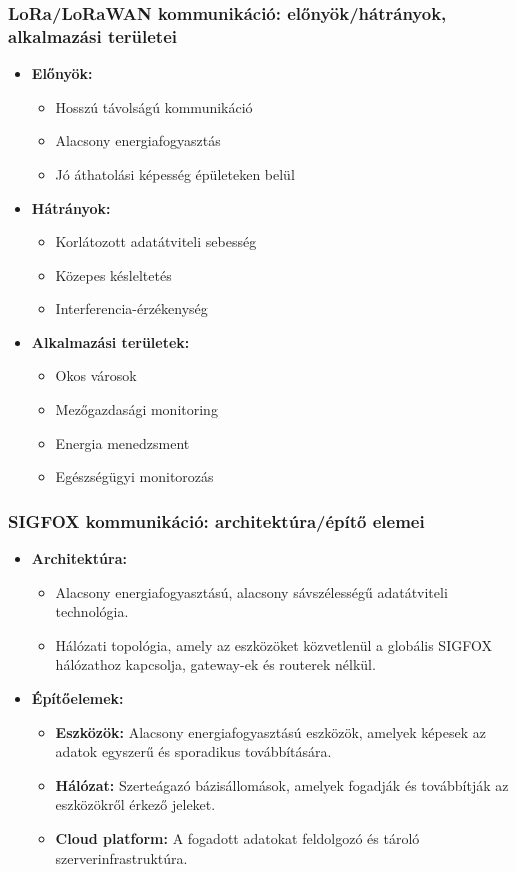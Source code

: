 \subsubsection{LoRa/LoRaWAN kommunikáció: előnyök/hátrányok, alkalmazási területei}
\begin{itemize}
    \item \textbf{Előnyök:}
    \begin{itemize}
        \item Hosszú távolságú kommunikáció
        \item Alacsony energiafogyasztás
        \item Jó áthatolási képesség épületeken belül
    \end{itemize}
    \item \textbf{Hátrányok:}
    \begin{itemize}
        \item Korlátozott adatátviteli sebesség
        \item Közepes késleltetés
        \item Interferencia-érzékenység
    \end{itemize}
    \item \textbf{Alkalmazási területek:}
    \begin{itemize}
        \item Okos városok
        \item Mezőgazdasági monitoring
        \item Energia menedzsment
        \item Egészségügyi monitorozás
    \end{itemize}
\end{itemize}

\clearpage
\subsubsection{SIGFOX kommunikáció: architektúra/építő elemei}
\begin{itemize}
    \item \textbf{Architektúra:}
    \begin{itemize}
        \item Alacsony energiafogyasztású, alacsony sávszélességű adatátviteli technológia.
        \item Hálózati topológia, amely az eszközöket közvetlenül a globális SIGFOX hálózathoz kapcsolja, gateway-ek és routerek nélkül.
    \end{itemize}
    \item \textbf{Építőelemek:}
    \begin{itemize}
        \item \textbf{Eszközök:} Alacsony energiafogyasztású eszközök, amelyek képesek az adatok egyszerű és sporadikus továbbítására.
        \item \textbf{Hálózat:} Szerteágazó bázisállomások, amelyek fogadják és továbbítják az eszközökről érkező jeleket.
        \item \textbf{Cloud platform:} A fogadott adatokat feldolgozó és tároló szerverinfrastruktúra.
    \end{itemize}
\end{itemize}

